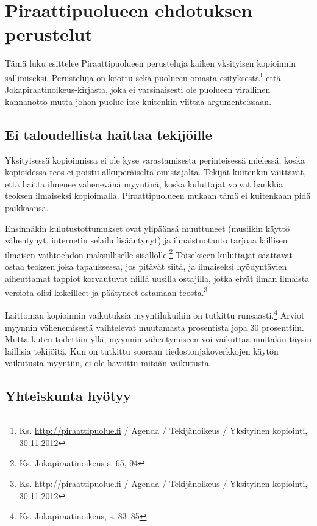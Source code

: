 \documentclass[titlepage,12pt]{article}
\begin{document}


\section{Piraattipuolueen ehdotuksen perustelut}

Tämä luku esittelee Piraattipuolueen perusteluja kaiken yksityisen
kopioinnin sallimiseksi.  Perusteluja on koottu sekä puolueen omasta
esityksestä\footnote{Ks. \url{http://piraattipuolue.fi} / Agenda /
  Tekijänoikeus / Yksityinen kopiointi, 30.11.2012} että
Jokapiraatin\-oikeus-kirjasta, joka ei varsinaisesti ole puolueen
virallinen kannanotto mutta johon puolue itse kuitenkin viittaa
argumenteissaan.

\subsection{Ei taloudellista haittaa tekijöille}

Yksityisessä kopioinnissa ei ole kyse varastamisesta perinteisessä
mielessä, koska kopioidessa teos ei poistu alkuperäiseltä omistajalta.
Tekijät kuitenkin väittävät, että haitta ilmenee vähenevänä myyntinä,
koska kuluttajat voivat hankkia teoksen ilmaiseksi kopioimalla.
Piraattipuolueen mukaan tämä ei kuitenkaan pidä paikkaansa.

Ensinnäkin kulutustottumukset ovat ylipäänsä muuttuneet (musiikin
käyttö vähentynyt, internetin selailu lisääntynyt) ja ilmaistuotanto
tarjoaa laillisen ilmaisen vaihtoehdon maksulliselle
sisällölle.\footnote{Ks. Jokapiraatinoikeus s. 65, 94} Toisekseen
kuluttajat saattavat ostaa teoksen joka tapauksessa, jos pitävät
siitä, ja ilmaiseksi hyödyntävien aiheuttamat tappiot korvautuvat
niillä uusilla ostajilla, jotka eivät ilman ilmaista versiota olisi
kokeilleet ja päätyneet ostamaan
teosta.\footnote{Ks. \url{http://piraattipuolue.fi} / Agenda /
  Tekijänoikeus / Yksityinen kopiointi, 30.11.2012}

Laittoman kopioinnin vaikutuksia myyntilukuihin on tutkittu
runsaasti.\footnote{Ks. Jokapiraatinoikeus, s. 83--85} Arviot
myynnin vähenemisestä vaihtelevat muutamasta prosentista jopa 30
prosenttiin.  Mutta kuten todettiin yllä, myynnin vähentymiseen voi
vaikuttaa muitakin täysin laillisia tekijöitä.  Kun on tutkittu
suoraan tiedostonjakoverkkojen käytön vaikutusta myyntiin, ei ole
havaittu mitään vaikutusta.%


\subsection{Yhteiskunta hyötyy}
\end{document}
